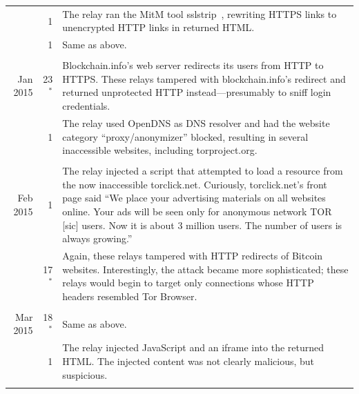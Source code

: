 \begin{table}
\begin{tabularx}{\textwidth}{r r X}
& 1 & The relay ran the MitM tool sslstrip~\cite{sslstrip}, rewriting
HTTPS links to unencrypted HTTP links in returned HTML. \\

& 1 & Same as above. \\

& & \\

Jan 2015 & 23$^*$ & Blockchain.info's web server redirects its
users from HTTP to HTTPS.  These relays tampered with blockchain.info's redirect
and returned unprotected HTTP instead---presumably to sniff login credentials. \\

& 1 & The relay used OpenDNS as DNS resolver and had the website category
``proxy/anonymizer'' blocked, resulting in several inaccessible websites,
including torproject.org. \\

& & \\

Feb 2015 & 1 & The relay injected a script that attempted to load a resource
from the now inaccessible torclick.net.  Curiously, torclick.net's front page
said ``We place your advertising materials on all websites online.  Your ads
will be seen only for anonymous network TOR [sic] users.  Now it is about 3
million users. The number of users is always growing.'' \\

& 17$^*$ & Again, these relays tampered with HTTP redirects of Bitcoin
websites.  Interestingly, the attack became more sophisticated; these relays
would begin to target only connections whose HTTP headers resembled Tor
Browser.
\\

& & \\

Mar 2015 & 18$^*$ & Same as above. \\

& 1 & The relay injected JavaScript and an iframe into the returned
HTML.  The injected content was not clearly malicious, but suspicious. \\

& & \\


\end{tabularx}
\end{table}
